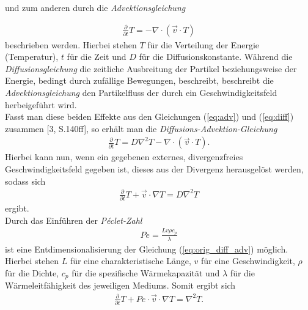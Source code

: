 \documentclass[12pt,a4paper,titlepage,headinclude,bibtotoc]{scrartcl}
\begin{document}
und zum anderen durch die \textit{Advektionsgleichung}

\begin{align}
\label{eq:adv}
\frac{\partial}{\partial t}T = - \nabla \cdot (\vec{v}\cdot T)
\end{align}
beschrieben werden. Hierbei stehen $T$ für die Verteilung der Energie (Temperatur), $t$ für die Zeit und $D$ für die Diffusionskonstante.
Während die \textit{Diffusionsgleichung} die zeitliche Ausbreitung der Partikel beziehungsweise der Energie, bedingt durch zufällige Bewegungen, beschreibt, beschreibt die \textit{Advektionsgleichung} den Partikelfluss der durch ein Geschwindigkeitsfeld herbeigeführt wird.\\
Fasst man diese beiden Effekte aus den Gleichungen (\ref{eq:adv}) und (\ref{eq:diff}) zusammen [3, S.140ff], so erhält man die \textit{Diffusions-Advektion-Gleichung}
\begin{align*}
\frac{\partial}{\partial t}T = D \nabla^2 T - \nabla \cdot (\vec{v}\cdot T).
\end{align*}
Hierbei kann nun, wenn ein gegebenen externes, divergenzfreies Geschwindigkeitsfeld gegeben ist, dieses aus der Divergenz herausgelöst werden, sodass sich
\begin{align}
\label{eq:orig_diff_adv}
\frac{\partial}{\partial t} T + \vec{v} \cdot \nabla T = D \nabla^2 T
\end{align}
ergibt.\\
Durch das Einführen der \textit{Péclet-Zahl}
\begin{align*}
Pe = \frac{L v \rho c_p}{\lambda}
\end{align*}
ist eine Entdimensionalisierung der Gleichung (\ref{eq:orig_diff_adv}) möglich. Hierbei stehen $L$ für eine charakteristische Länge, $v$ für eine Geschwindigkeit, $\rho$ für die Dichte, $c_p$ für die spezifische Wärmekapazität und $\lambda$ für die Wärmeleitfähigkeit des jeweiligen Mediums. Somit ergibt sich
\begin{align}
\label{eq:diff_adv}
\frac{\partial}{\partial t} T + Pe \cdot \vec{v} \cdot \nabla T = \nabla^2 T.
\end{align}
\end{document}
